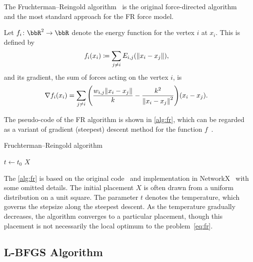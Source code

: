 \documentclass[dvipdfmx,10pt,journal,compsoc]{IEEEtran}
\newcommand{\defeq}{\coloneqq}
\begin{document}
The Fruchterman--Reingold algorithm~\cite{fruchtermanGraphDrawingForcedirected1991} is the original force-directed algorithm and the most standard approach for the FR force model.

Let $f_i\colon \bbR^2 \to \bbR$ denote the energy function for the vertex $i$ at $x_i$. This is defined by
\begin{equation}\label{eq:fi}
  f_i(x_i) \defeq \sum_{j \neq i} E_{i,j}(\norm{x_i - x_j}),
\end{equation}
and its gradient, the sum of forces acting on the vertex $i$, is
\begin{equation}\label{eq:gradientFi}
  \nabla f_i(x_i) = \sum_{j \neq i} \qty(\frac{w_{i,j}\norm{x_i - x_j}}{k} - \frac{k^2}{\norm{x_i - x_j}^2}) (x_i-x_j).
\end{equation}

The pseudo-code of the FR algorithm is shown in \cref{alg:fr}, which can be regarded as a variant of gradient (steepest) descent method for the function $f$~\cite{tunkelang1999numerical}.
\begin{algorithm}[ht]
  \caption{Fruchterman--Reingold algorithm}
  \label{alg:fr}

  $t \gets t_0$\;
  \Return $X$\;
\end{algorithm}

The \cref{alg:fr} is based on the original code~\cite{fruchtermanGraphDrawingForcedirected1991} and implementation in NetworkX~\cite{hagberg2008exploring} with some omitted details.
The initial placement $X$ is often drawn from a uniform distribution on a unit square.
The parameter $t$ denotes the temperature, which governs the stepsize along the steepest descent. As the temperature gradually decreases, the algorithm converges to a particular placement, though this placement is not necessarily the local optimum to the problem~\eqref{eq:fr}.

\subsection{L-BFGS Algorithm}\label{ssec:lbfgs}
\end{document}
